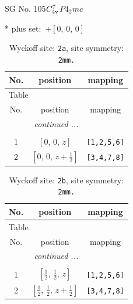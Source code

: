 \documentclass[fleqn,8pt]{jsarticle}
\begin{document}
\setcounter{MaxMatrixCols}{32}

\renewcommand{\tablename}{Table~}
\renewcommand{\figurename}{Figure~}
\begin{center}
\LARGE
SG No. 105\quad$C_{\rm 4v}^{7}$\quad$P4_2mc$\quad[ tetragonal ]
\end{center}
* plus set:\,\,\,$+\left[ 0,\, 0,\, 0 \right]$
\renewcommand{\arraystretch}{1.2}
\begin{longtable}{ccc}
\caption{Wyckoff site: {\tt 2a}, site symmetry: {\tt 2mm.}}
 \\
 \hline \hline
No. & position & mapping \\ \hline \endfirsthead

\multicolumn{2}{l}{\tablename\ \thetable{}} \\
 \hline \hline
No. & position & mapping \\ \hline \endhead

 \hline \hline
\multicolumn{2}{r}{\footnotesize\it continued ...} \\ \endfoot

 \hline \hline
\multicolumn{2}{r}{} \\ \endlastfoot

1 & $\left[ 0,\, 0,\, z \right]$ & {\tt [1,2,5,6]} \\ \hline
2 & $\left[ 0,\, 0,\, z + \frac{1}{2} \right]$ & {\tt [3,4,7,8]} \\
\end{longtable}
\renewcommand{\arraystretch}{1.2}
\begin{longtable}{ccc}
\caption{Wyckoff site: {\tt 2b}, site symmetry: {\tt 2mm.}}
 \\
 \hline \hline
No. & position & mapping \\ \hline \endfirsthead

\multicolumn{2}{l}{\tablename\ \thetable{}} \\
 \hline \hline
No. & position & mapping \\ \hline \endhead

 \hline \hline
\multicolumn{2}{r}{\footnotesize\it continued ...} \\ \endfoot

 \hline \hline
\multicolumn{2}{r}{} \\ \endlastfoot

1 & $\left[ \frac{1}{2},\, \frac{1}{2},\, z \right]$ & {\tt [1,2,5,6]} \\ \hline
2 & $\left[ \frac{1}{2},\, \frac{1}{2},\, z + \frac{1}{2} \right]$ & {\tt [3,4,7,8]} \\
\end{longtable}
\end{document}
